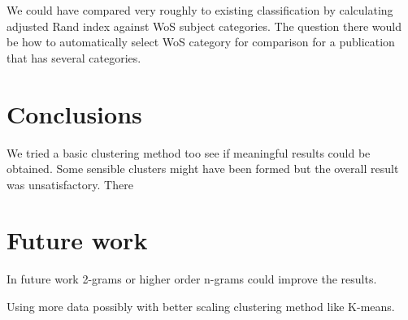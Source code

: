 We could have compared very roughly to existing classification by
calculating adjusted Rand index against WoS subject categories.
The question there would be how to automatically select WoS 
category for comparison for a publication that has several 
categories.

\section*{Conclusions}
\label{sec:conclusions}
We tried a basic clustering method too see if meaningful results
could be obtained. Some sensible clusters might have been formed 
but the overall result was unsatisfactory. There 

\section*{Future work}
\label{sec:future}
In future work 2-grams or higher order n-grams could improve the 
results.

Using more data possibly with better scaling clustering method like 
K-means.
